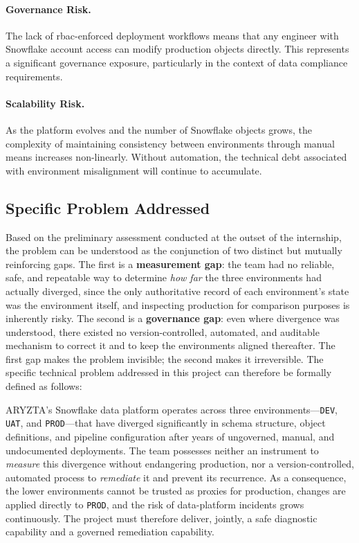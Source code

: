 \paragraph{Governance Risk.} The lack of \gls{rbac}-enforced deployment workflows means that any engineer with Snowflake account access can modify production objects directly. This represents a significant governance exposure, particularly in the context of data compliance requirements.

\paragraph{Scalability Risk.} As the platform evolves and the number of Snowflake objects grows, the complexity of maintaining consistency between environments through manual means increases non-linearly. Without automation, the technical debt associated with environment misalignment will continue to accumulate.

\subsection{Specific Problem Addressed}
\label{subsec:specific-problem}

Based on the preliminary assessment conducted at the outset of the internship, the problem can be understood as the conjunction of two distinct but mutually reinforcing gaps. The first is a \textbf{measurement gap}: the team had no reliable, safe, and repeatable way to determine \emph{how far} the three environments had actually diverged, since the only authoritative record of each environment's state was the environment itself, and inspecting production for comparison purposes is inherently risky. The second is a \textbf{governance gap}: even where divergence was understood, there existed no version-controlled, automated, and auditable mechanism to correct it and to keep the environments aligned thereafter. The first gap makes the problem invisible; the second makes it irreversible. The specific technical problem addressed in this project can therefore be formally defined as follows:

\begin{tcolorbox}[notebox, title={Problem Statement}]
ARYZTA's Snowflake data platform operates across three environments---\texttt{DEV}, \texttt{UAT}, and \texttt{PROD}---that have diverged significantly in schema structure, object definitions, and pipeline configuration after years of ungoverned, manual, and undocumented deployments. The team possesses neither an instrument to \emph{measure} this divergence without endangering production, nor a version-controlled, automated process to \emph{remediate} it and prevent its recurrence. As a consequence, the lower environments cannot be trusted as proxies for production, changes are applied directly to \texttt{PROD}, and the risk of data-platform incidents grows continuously. The project must therefore deliver, jointly, a safe diagnostic capability and a governed remediation capability.
\end{tcolorbox}


